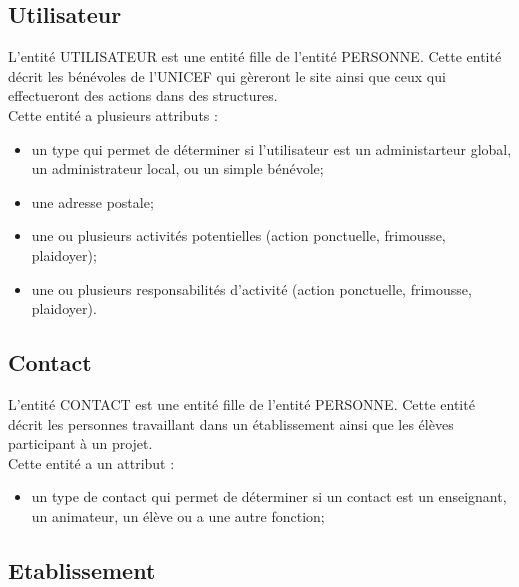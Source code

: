 \documentclass[asi, sansVersion]{picINSA}
\begin{document}
\subsection*{Utilisateur}

L'entité UTILISATEUR est une entité fille de l'entité PERSONNE. Cette entité décrit les bénévoles de l'UNICEF qui gèreront le site ainsi que ceux qui effectueront des actions dans des structures. \\
Cette entité a plusieurs attributs : 
\begin{itemize} 
\item un type qui permet de déterminer si l'utilisateur est un administarteur global, un administrateur local, ou un simple bénévole;
\item une adresse postale;
\item une ou plusieurs activités potentielles (action ponctuelle, frimousse, plaidoyer); %
\item une ou plusieurs responsabilités d'activité (action ponctuelle, frimousse, plaidoyer). 
\end{itemize}

\subsection*{Contact}

L'entité CONTACT est une entité fille de l'entité PERSONNE. Cette entité décrit les personnes travaillant dans un établissement ainsi que les élèves participant à un projet. \\
Cette entité a un attribut : 
\begin{itemize}
\item un type de contact qui permet de déterminer si un contact est un enseignant, un animateur, un élève ou a une autre fonction; 
\end{itemize} 

\subsection*{Etablissement}
\end{document}
